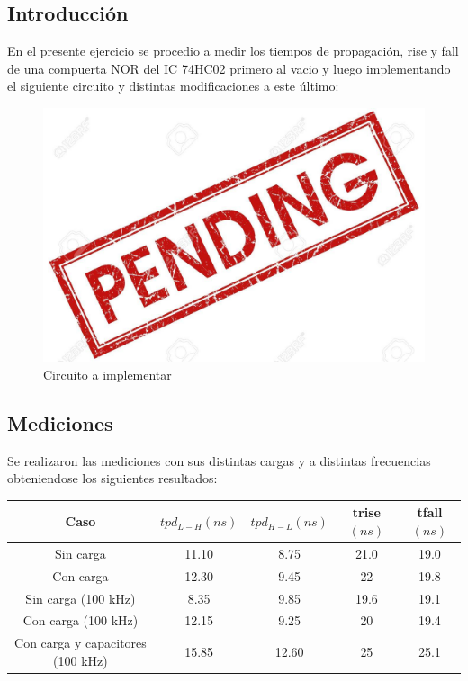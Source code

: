 


\subsection{Introducción}

En el presente ejercicio se procedio a medir los tiempos de propagación, rise y fall de una compuerta NOR del IC 74HC02 primero al vacio y luego implementando el siguiente circuito y distintas modificaciones a este último:

\begin{figure}[h]
    \centering
    \includegraphics{ImagenesEjercicio4/pend.jpg}
    \caption{Circuito a implementar}
\end{figure}

\subsection{Mediciones}

Se realizaron las mediciones con sus distintas cargas y a distintas frecuencias obteniendose los siguientes resultados:

\begin{table}[]
\centering
\begin{tabular}{|c|c|c|c|c|}
\hline
Caso & $tpd_{L-H}(ns)$ & $tpd_{H-L}(ns)$ & trise$(ns)$ & tfall$(ns)$ \\ \hline
Sin carga & 11.10 & 8.75 & 21.0 & 19.0 \\ \hline
Con carga & 12.30 & 9.45 & 22 & 19.8 \\ \hline
Sin carga (100 kHz) & 8.35 & 9.85 & 19.6 & 19.1 \\ \hline
Con carga (100 kHz) & 12.15 & 9.25 & 20 & 19.4 \\ \hline
Con carga y capacitores (100 kHz) & 15.85 & 12.60 & 25 & 25.1 \\ \hline
\end{tabular}
\end{table}




